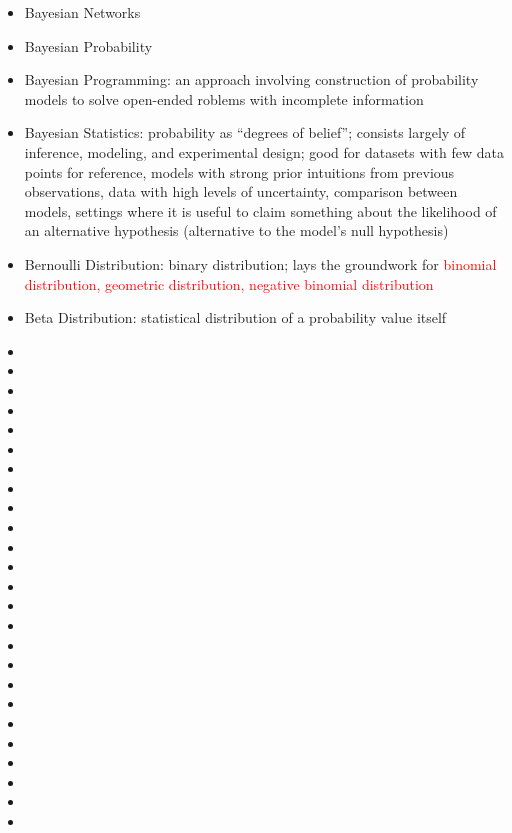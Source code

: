 \documentclass[a4paper]{article}
\newcommand{\cmark}{\ding{51}}%
\newcommand{\done}{\rlap{$\square$}{\raisebox{2pt}{\large\hspace{1pt}\cmark}}\hspace{-2.5pt}}
\newcommand{\followup}[1]{\textcolor{red}{ #1 }}
\begin{document}
\begin{itemize}
    \item [\done] Bayesian Networks
    \item [\done] Bayesian Probability
    \item [\done] Bayesian Programming: an approach involving construction of probability models to solve open-ended roblems with incomplete information
    \item [\done] Bayesian Statistics: probability as ``degrees of belief''; consists largely of inference, modeling, and experimental design; good for datasets with few data points for reference, models with strong prior intuitions from previous observations, data with high levels of uncertainty, comparison between models, settings where it is useful to claim something about the likelihood of an alternative hypothesis (alternative to the model's null hypothesis)
    \item [\done] Bernoulli Distribution: binary distribution; lays the groundwork for \followup{binomial distribution, geometric distribution, negative binomial distribution}
    \item [\done] Beta Distribution: statistical distribution of a probability value itself
    \item [\done]
    \item [\done]
    \item [\done]
    \item [\done]
    \item [\done]
    \item [\done]
    \item [\done]
    \item [\done]
    \item [\done]
    \item [\done]
    \item [\done]
    \item [\done]
    \item [\done]
    \item [\done]
    \item [\done]
    \item [\done]
    \item [\done]
    \item [\done]
    \item [\done]
    \item [\done]
    \item [\done]
    \item [\done]
    \item [\done]
    \item [\done]
    \item [\done]

\end{itemize}
\end{document}
